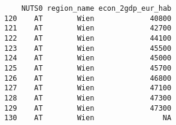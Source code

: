\documentclass[]{article}
\newenvironment{Shaded}{\begin{snugshade}}{\end{snugshade}}
\newcommand{\NormalTok}[1]{#1}
\newcommand{\OperatorTok}[1]{\textcolor[rgb]{0.81,0.36,0.00}{\textbf{#1}}}
\begin{document}
\begin{verbatim}
    NUTS0 region_name econ_2gdp_eur_hab
120    AT        Wien             40800
121    AT        Wien             42700
122    AT        Wien             44100
123    AT        Wien             45500
124    AT        Wien             45000
125    AT        Wien             45700
126    AT        Wien             46800
127    AT        Wien             47100
128    AT        Wien             47300
129    AT        Wien             47300
130    AT        Wien                NA
\end{verbatim}

\begin{Shaded}
\end{Shaded}
\end{document}
